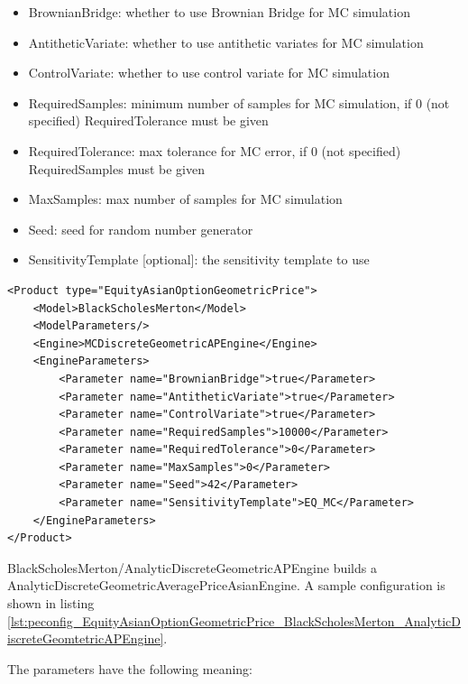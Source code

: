 \begin{itemize}
\item BrownianBridge: whether to use Brownian Bridge for MC simulation
\item AntitheticVariate: whether to use antithetic variates for MC simulation
\item ControlVariate: whether to use control variate for MC simulation
\item RequiredSamples: minimum number of samples for MC simulation, if 0 (not specified) RequiredTolerance must be given
\item RequiredTolerance: max tolerance for MC error, if 0 (not specified) RequiredSamples must be given
\item MaxSamples: max number of samples for MC simulation
\item Seed: seed for random number generator
\item SensitivityTemplate [optional]: the sensitivity template to use
\end{itemize}

\begin{longlisting}
\begin{verbatim}
<Product type="EquityAsianOptionGeometricPrice">
    <Model>BlackScholesMerton</Model>
    <ModelParameters/>
    <Engine>MCDiscreteGeometricAPEngine</Engine>
    <EngineParameters>
        <Parameter name="BrownianBridge">true</Parameter>
        <Parameter name="AntitheticVariate">true</Parameter>
        <Parameter name="ControlVariate">true</Parameter>
        <Parameter name="RequiredSamples">10000</Parameter>
        <Parameter name="RequiredTolerance">0</Parameter>
        <Parameter name="MaxSamples">0</Parameter>
        <Parameter name="Seed">42</Parameter>
        <Parameter name="SensitivityTemplate">EQ_MC</Parameter>
    </EngineParameters>
</Product>
\end{verbatim}
\caption{Configuration for Product EquityAsianOptionGeometricPrice, Model BlackScholesMerton, Engine MCDiscreteGeometricAPEngine}
\label{lst:peconfig_EquityAsianOptionGeometricPrice_BlackScholesMerton_MCDiscreteGeomtetricAPEngine}
\end{longlisting}

BlackScholesMerton/AnalyticDiscreteGeometricAPEngine builds a AnalyticDiscreteGeometricAveragePriceAsianEngine. A sample
configuration is shown in listing
\ref{lst:peconfig_EquityAsianOptionGeometricPrice_BlackScholesMerton_AnalyticDiscreteGeomtetricAPEngine}.

The parameters have the following meaning:

